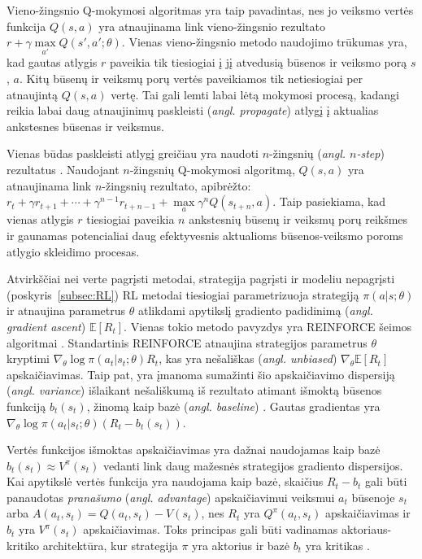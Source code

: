 \documentclass{VUMIFPSbakalaurinis}
\begin{document}
{	Vieno-žingsnio Q-mokymosi algoritmas yra taip pavadintas, nes jo veiksmo vertės funkcija \(Q(s, a)\) yra atnaujinama link vieno-žingsnio rezultato \(r + \gamma \max\limits_{a'} Q(s', a'; \theta) \). Vienas vieno-žingsnio metodo naudojimo trūkumas yra, kad gautas atlygis \(r\) paveikia tik tiesiogiai į jį atvedusią būsenos ir veiksmo porą \(s\), \(a\). Kitų būsenų ir veiksmų porų vertės paveikiamos tik netiesiogiai per atnaujintą \(Q(s, a)\) vertę. Tai gali lemti labai lėtą mokymosi procesą, kadangi reikia labai daug atnaujinimų paskleisti (\textit{angl. propagate}) atlygį į aktualias ankstesnes būsenas ir veiksmus.\par
	
	Vienas būdas paskleisti atlygį greičiau yra naudoti \(n\)-žingsnių (\textit{angl. \(n\)-step}) rezultatus \cite{watkins, peng_williams_1994}. Naudojant \(n\)-žingsnių Q-mokymosi algoritmą, \(Q(s, a)\) yra atnaujinama link \(n\)-žingsnių rezultato, apibrėžto: \(r_t + \gamma r_{t+1} + \cdots + \gamma^{n-1} r_{t+n-1} + \max\limits_a \gamma^n Q(s_{t+n}, a) \). Taip pasiekiama, kad vienas atlygis \(r\) tiesiogiai paveikia \(n\) ankstesnių būsenų ir veiksmų porų reikšmes ir gaunamas potencialiai daug efektyvesnis aktualioms būsenos-veiksmo poroms atlygio skleidimo procesas.\par
	
	Atvirkščiai nei verte pagrįsti metodai, strategija pagrįsti ir modeliu nepagrįsti (poskyris~\ref{subsec:RL}) RL metodai tiesiogiai parametrizuoja strategiją \(\pi(a|s;\theta)\) ir atnaujina parametrus \(\theta\) atlikdami apytikslį gradiento padidinimą (\textit{angl. gradient ascent}) \(\mathbb{E}[R_t]\). Vienas tokio metodo pavyzdys yra REINFORCE šeimos algoritmai \cite{williams_1992}. Standartinis REINFORCE atnaujina strategijos parametrus \(\theta\) kryptimi \(\nabla_\theta \log \pi(a_t|s_t; \theta)R_t\), kas yra nešališkas (\textit{angl. unbiased}) \(\nabla_\theta \mathbb{E}[R_t] \) apskaičiavimas. Taip pat, yra įmanoma sumažinti šio apskaičiavimo dispersiją (\textit{angl. variance}) išlaikant nešališkumą iš rezultato atimant išmoktą būsenos funkciją \(b_t(s_t)\), žinomą kaip bazė (\textit{angl. baseline}) \cite{williams_1992}. Gautas gradientas yra \(\nabla_\theta \log \pi(a_t|s_t; \theta)(R_t - b_t(s_t))\).\par
	
	Vertės funkcijos išmoktas apskaičiavimas yra dažnai naudojamas kaip bazė \(b_t(s_t) \approx V^\pi(s_t) \) vedanti link daug mažesnės strategijos gradiento dispersijos. Kai apytikslė vertės funkcija yra naudojama kaip bazė, skaičius \(R_t - b_t\) gali būti panaudotas \textit{pranašumo} (\textit{angl. advantage}) apskaičiavimui veiksmui \(a_t\) būsenoje \(s_t\) arba \(A(a_t, s_t) = Q(a_t, s_t) - V(s_t)\), nes \(R_t\) yra \(Q^\pi (a_t, s_t)\) apskaičiavimas ir \(b_t\) yra \(V^\pi(s_t)\) apskaičiavimas. Toks principas gali būti vadinamas aktoriaus-kritiko architektūra, kur strategija \(\pi\) yra aktorius ir bazė \(b_t\) yra kritikas \cite{rl_intro_book}.
}
\end{document}
